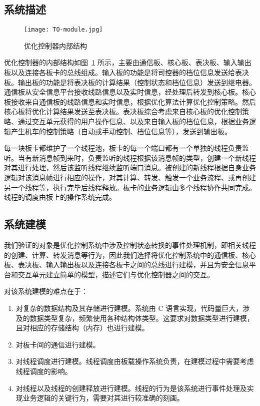 \subsection{系统描述}

\begin{figure}
\centering
\texttt{[image: TO-module.jpg]}
\caption{优化控制器内部结构}
\label{f:TO-module}
\end{figure}

优化控制器的内部结构如图~\ref{f:TO-module} 所示，主要由通信板、核心板、表决板、输入输出板以及连接各板卡的总线组成。输入板的功能是将司控器的档位信息发送给表决板。输出板的功能是将表决板的计算结果（控制状态和档位信息）发送到继电器。通信板从安全信息平台接收线路信息以及实时信息，经处理后转发到核心板。核心板接收来自通信板的线路信息和实时信息，根据优化算法计算优化控制策略。然后核心板将优化计算结果发送至表决板。表决板综合考虑来自核心板的优化控制策略、通过交互单元获得的用户操作信息、以及来自输入板的档位信息，根据业务逻辑产生机车的控制策略（自动或手动控制、档位信息等），发送到输出板。

每一块板卡都维护了一个线程池，板卡的每一个端口都有一个单独的线程负责监听。当有新消息帧到来时，负责监听的线程根据该消息帧的类型，创建一个新线程对其进行处理，然后该监听线程继续监听端口消息。被创建的新线程根据自身业务逻辑对该消息帧进行相应的操作，对其计算、转发、触发一个业务流程、或再创建另一个线程等，执行完毕后线程释放。板卡的业务逻辑由多个线程协作共同完成。线程的调度由板上的操作系统完成。


\subsection{系统建模}

我们验证的对象是优化控制系统中涉及控制状态转换的事件处理机制，即相关线程的创建、计算、转发消息等行为，因此我们选择将优化控制系统中的通信板、核心板、表决板、输入输出板以及连接各板卡之间的总线进行建模，并且为安全信息平台和交互单元建立简单的模型，描述它们与优化控制器之间的交互。

对该系统建模的难点在于：
\begin{enumerate}  
\item 对复杂的数据结构及其存储进行建模。系统由 C 语言实现，代码量巨大，涉及的数据类型复杂，频繁使用各种结构体类型。这要求对数据类型进行建模，且对相应的存储结构（内存）也进行建模。
\item 对板卡间的通信进行建模。
\item 对线程调度进行建模。线程调度由板载操作系统负责，在建模过程中需要考虑线程调度的影响。
\item 对线程以及线程的创建释放进行建模。线程的行为是该系统进行事件处理及实现业务逻辑的关键行为，需要对其进行较准确的刻画。
\end{enumerate}

